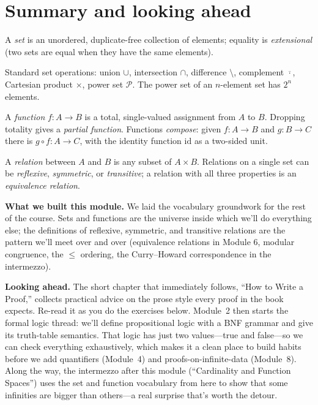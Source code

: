 \documentclass[11pt]{article}
\begin{document}
\section{Summary and looking ahead}

\begin{keytakeaway}
  \item A \emph{set} is an unordered, duplicate-free collection of elements; equality is \emph{extensional} (two sets are equal when they have the same elements).
  \item Standard set operations: union $\cup$, intersection $\cap$, difference $\setminus$, complement $\overline{\cdot}$, Cartesian product $\times$, power set $\mathcal{P}$. The power set of an $n$-element set has $2^n$ elements.
  \item A \emph{function} $f : A \to B$ is a total, single-valued assignment from $A$ to $B$. Dropping totality gives a \emph{partial function}. Functions \emph{compose}: given $f : A \to B$ and $g : B \to C$ there is $g \circ f : A \to C$, with the identity function $\mathrm{id}$ as a two-sided unit.
  \item A \emph{relation} between $A$ and $B$ is any subset of $A \times B$. Relations on a single set can be \emph{reflexive}, \emph{symmetric}, or \emph{transitive}; a relation with all three properties is an \emph{equivalence relation}.
\end{keytakeaway}

\begin{summarybox}
\textbf{What we built this module.} We laid the vocabulary groundwork for the rest of the course. Sets and functions are the universe inside which we'll do everything else; the definitions of reflexive, symmetric, and transitive relations are the pattern we'll meet over and over (equivalence relations in Module 6, modular congruence, the $\leq$ ordering, the Curry--Howard correspondence in the intermezzo).

\medskip
\textbf{Looking ahead.} The short chapter that immediately follows, ``How to Write a Proof,'' collects practical advice on the prose style every proof in the book expects. Re-read it as you do the exercises below. Module~2 then starts the formal logic thread: we'll define propositional logic with a BNF grammar and give its truth-table semantics. That logic has just two values---true and false---so we can check everything exhaustively, which makes it a clean place to build habits before we add quantifiers (Module~4) and proofs-on-infinite-data (Module~8). Along the way, the intermezzo after this module (``Cardinality and Function Spaces'') uses the set and function vocabulary from here to show that some infinities are bigger than others---a real surprise that's worth the detour.
\end{summarybox}
\end{document}
